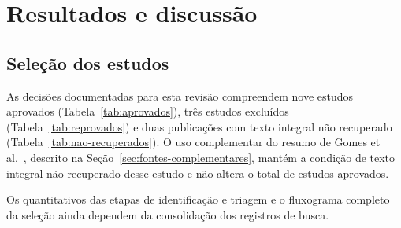 \section{Resultados e discussão}\label{sec:resultados}

\subsection{Seleção dos estudos}\label{sec:avaliacao}

As decisões documentadas para esta revisão compreendem nove estudos
aprovados (Tabela~\ref{tab:aprovados}), três estudos excluídos
(Tabela~\ref{tab:reprovados}) e duas publicações com texto integral não
recuperado (Tabela~\ref{tab:nao-recuperados}). O uso complementar do resumo
de Gomes et al.~, descrito na
Seção~\ref{sec:fontes-complementares}, mantém a condição de texto integral
não recuperado desse estudo e não altera o total de estudos aprovados.

Os quantitativos das etapas de identificação e triagem e o fluxograma
completo da seleção ainda dependem da consolidação dos registros de busca.

